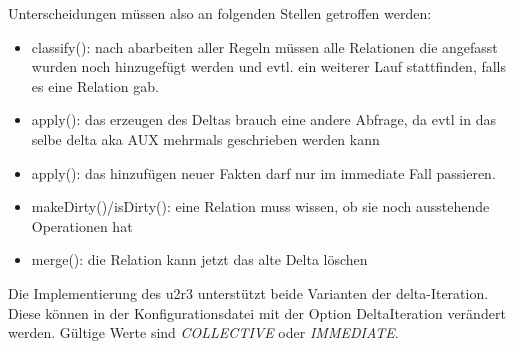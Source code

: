 Unterscheidungen müssen also an folgenden Stellen getroffen werden:
\begin{itemize}
  \item classify(): nach abarbeiten aller Regeln müssen alle Relationen die angefasst wurden noch hinzugefügt werden und evtl. ein weiterer Lauf stattfinden, falls es eine Relation gab.
  \item apply(): das erzeugen des Deltas brauch eine andere Abfrage, da evtl in das selbe delta aka AUX mehrmals geschrieben werden kann
  \item apply(): das hinzufügen neuer Fakten darf nur im immediate Fall passieren.
  \item makeDirty()/isDirty(): eine Relation muss wissen, ob sie noch ausstehende Operationen hat
  \item merge(): die Relation kann jetzt das alte Delta löschen 
\end{itemize}

Die Implementierung des u2r3 unterstützt beide Varianten der delta-Iteration. Diese können in der Konfigurationsdatei mit der Option DeltaIteration verändert werden. Gültige Werte sind \emph{COLLECTIVE} oder \emph{IMMEDIATE}.
